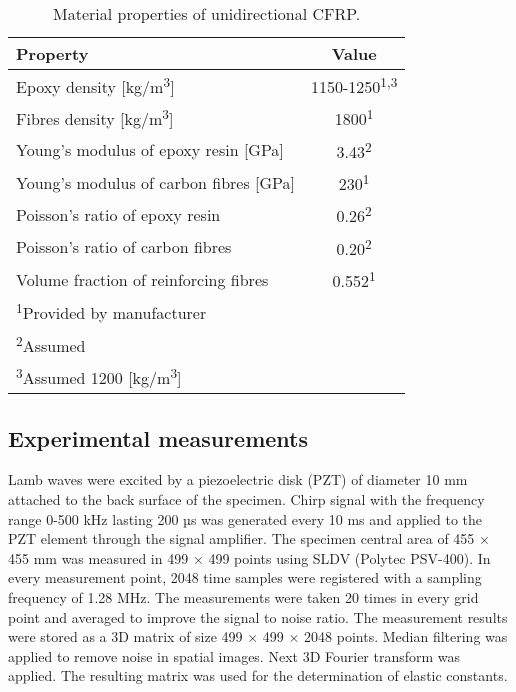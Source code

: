 \documentclass[preprint,12pt]{elsarticle}
\begin{document}
\begin{table}[h]
	\renewcommand{\arraystretch}{1.3}
	\centering \footnotesize
	\caption{Material properties of unidirectional CFRP.}
	\begin{tabular}{lc} 
		\toprule
		Property & Value \\
		\midrule
		Epoxy density [kg/m\textsuperscript{3}]& 1150-1250\textsuperscript{1,3} \\ 
		Fibres density [kg/m\textsuperscript{3}]& 1800\textsuperscript{1}\\ 
		Young’s modulus of epoxy resin [GPa] & 3.43\textsuperscript{2}\\
		Young’s modulus of carbon fibres [GPa] & 230\textsuperscript{1}\\
		Poisson’s ratio of epoxy resin & 0.26\textsuperscript{2}\\
		Poisson’s ratio of carbon fibres & 0.20\textsuperscript{2} \\
		Volume fraction of reinforcing fibres & 0.552\textsuperscript{1}\\
		\bottomrule 
		\textsuperscript{1}Provided by manufacturer &\\
		\textsuperscript{2}Assumed &\\
		\textsuperscript{3}Assumed 1200 [kg/m\textsuperscript{3}]&\\
	\end{tabular} 
	\label{tab:mat_prop_uni}
\end{table}

\subsection{Experimental measurements \label{sec:SLDV}}
Lamb waves were excited by a piezoelectric disk (PZT) of diameter 10 mm attached to the back surface of the specimen. 
Chirp signal with the frequency range 0-500 kHz lasting 200 µs was generated every 10 ms and applied to the PZT element through the signal amplifier.
The specimen central area of 455 $\times$ 455 mm was measured in 499 $\times$ 499 points using SLDV (Polytec PSV-400). 
In every measurement point, 2048 time samples were registered with a sampling frequency of 1.28 MHz. The measurements were taken 20 times in every grid point and averaged to improve the signal to noise ratio.
The measurement results were stored as a 3D matrix of size 499 $\times$ 499 $\times$ 2048 points. 
Median filtering was applied to remove noise in spatial images. Next 3D Fourier transform was applied. 
The resulting matrix was used for the determination of elastic constants.
\end{document}
